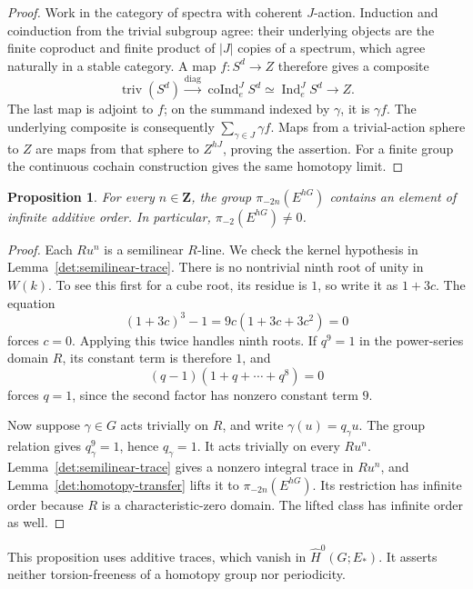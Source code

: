 \documentclass[11pt]{article}
\newtheorem{proposition}[theorem]{Proposition}
\theoremstyle{definition}
\theoremstyle{remark}
\numberwithin{equation}{section}
\begin{document}
\begin{proof}
Work in the category of spectra with coherent \(J\)-action.
Induction and coinduction from the trivial subgroup agree: their
underlying objects are the finite coproduct and finite product of
\(|J|\) copies of a spectrum, which agree naturally in a stable
category.  A map \(f:S^d\to Z\) therefore gives a composite
\[
 \operatorname{triv}(S^d)
 \xrightarrow{\mathrm{diag}}
 \operatorname{coInd}_e^J S^d
 \simeq \operatorname{Ind}_e^J S^d
 \longrightarrow Z.
\]
The last map is adjoint to \(f\); on the summand indexed by
\(\gamma\), it is \(\gamma f\).
The underlying composite is consequently
\(\sum_{\gamma\in J}\gamma f\).
Maps from a trivial-action sphere to \(Z\) are maps from that sphere
to \(Z^{hJ}\), proving the assertion.  For a finite group the
continuous cochain construction gives the same homotopy limit.
\end{proof}

\begin{proposition}\label{det:full-gap}
For every \(n\in\mathbf Z\), the group
\(\pi_{-2n}(E^{hG})\) contains an element of infinite additive order.
In particular, \(\pi_{-2}(E^{hG})\ne0\).
\end{proposition}

\begin{proof}
Each \(Ru^n\) is a semilinear \(R\)-line.  We check the kernel
hypothesis in Lemma~\ref{det:semilinear-trace}.
There is no nontrivial ninth root of unity in \(W(k)\).
To see this first for a cube root, its residue is \(1\), so write it
as \(1+3c\).  The equation
\[
 (1+3c)^3-1=9c(1+3c+3c^2)=0
\]
forces \(c=0\).  Applying this twice handles ninth roots.
If \(q^9=1\) in the power-series domain \(R\), its constant term is
therefore \(1\), and
\[
 (q-1)(1+q+\cdots+q^8)=0
\]
forces \(q=1\), since the second factor has nonzero constant term
\(9\).

Now suppose \(\gamma\in G\) acts trivially on \(R\), and write
\(\gamma(u)=q_\gamma u\).
The group relation gives \(q_\gamma^9=1\), hence \(q_\gamma=1\).
It acts trivially on every \(Ru^n\).
Lemma~\ref{det:semilinear-trace} gives a nonzero integral trace in
\(Ru^n\), and Lemma~\ref{det:homotopy-transfer} lifts it to
\(\pi_{-2n}(E^{hG})\).
Its restriction has infinite order because \(R\) is a
characteristic-zero domain.  The lifted class has infinite order
as well.
\end{proof}

This proposition uses additive traces, which vanish in
\(\widehat H^0(G;E_*)\).  It asserts neither torsion-freeness of a
homotopy group nor periodicity.
\end{document}
